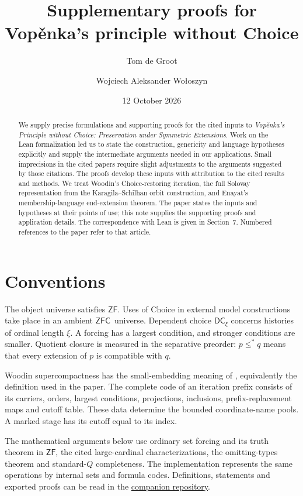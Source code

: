 \documentclass[11pt,a4paper]{amsart}
\title[Supplementary proofs]{Supplementary proofs for\\ Vop\v{e}nka's principle without Choice}
\author{Tom de Groot}
\author{Wojciech Aleksander Wo{\l}oszyn}
\date{12 October 2026}
\newcommand{\ZF}{\ensuremath{\mathsf{ZF}}}
\newcommand{\ZFC}{\ensuremath{\mathsf{ZFC}}}
\newcommand{\DC}{\ensuremath{\mathsf{DC}}}
\begin{document}
\begin{abstract}
We supply precise formulations and supporting proofs for the cited inputs to \emph{Vop\v{e}nka's Principle without Choice: Preservation under Symmetric Extensions}. Work on the Lean formalization led us to state the construction, genericity and language hypotheses explicitly and supply the intermediate arguments needed in our applications. Small imprecisions in the cited papers require slight adjustments to the arguments suggested by those citations. The proofs develop these inputs with attribution to the cited results and methods. We treat Woodin's Choice-restoring iteration, the full Solovay representation from the Karagila--Schilhan orbit construction, and Enayat's membership-language end-extension theorem. The paper states the inputs and hypotheses at their points of use; this note supplies the supporting proofs and application details. The correspondence with Lean is given in Section~7. Numbered references to the paper refer to that article.
\end{abstract}
\maketitle

\section{Conventions}
The object universe satisfies \ZF. Uses of Choice in external model constructions take place in an ambient \ZFC\ universe. Dependent choice $\DC_\xi$ concerns histories of ordinal length $\xi$. A forcing has a largest condition, and stronger conditions are smaller. Quotient closure is measured in the separative preorder: $p\leq^*q$ means that every extension of $p$ is compatible with $q$.

Woodin supercompactness has the small-embedding meaning of \cite[Definition 220 and Lemma 222]{Woodin}, equivalently the definition used in the paper. The complete code of an iteration prefix consists of its carriers, orders, largest conditions, projections, inclusions, prefix-replacement maps and cutoff table. These data determine the bounded coordinate-name pools. A marked stage has its cutoff equal to its index.

The mathematical arguments below use ordinary set forcing and its truth theorem in \ZF, the cited large-cardinal characterizations, the omitting-types theorem and standard-$Q$ completeness. The implementation represents the same operations by internal sets and formula codes. Definitions, statements and exported proofs can be read in the \href{https://github.com/Tomodovodoo/vopenka-without-choice}{companion repository}.
\end{document}
